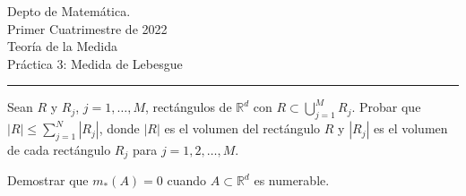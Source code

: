 \documentclass{book}
\newcommand{\rr}{\mathbb{R}}
\begin{document}


\begin{large}
\begin{bfseries} %
        \noindent Depto de Matem\'atica.\\
        Primer Cuatrimestre de 2022\\                                                                                                                                                                                                                                                                                                                                                
        Teoría de la Medida \\
        Práctica 3: Medida de Lebesgue

\end{bfseries}
\end{large}
\par\noindent\rule{\textwidth}{.5pt}









\begin{ejer}{} Sean $R$ y $R_j$, $j=1,\ldots,M$, rectángulos de  $\rr^d$ con $R\subset \bigcup\limits_{j=1}^M R_j$. 
 Probar que $|R|\leq \sum\limits_{j=1}^N |R_j|$, 
 donde $|R|$ es el volumen del rect\'angulo $R$ y 
 $|R_j|$ es el volumen de cada  rect\'angulo $R_j$ para $j=1,2,\ldots,M.$
\end{ejer}


\begin{ejer}{}  Demostrar que  $m_*(A)=0$  cuando $A\subset\mathbb{R}^d$ es numerable.
\end{ejer}  

\end{document}
